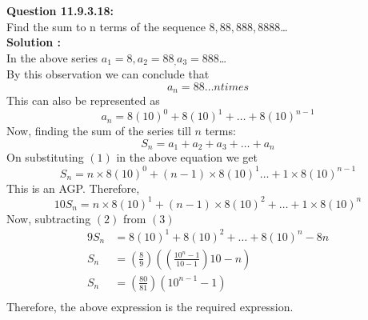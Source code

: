 \documentclass[12pt]{article}
\begin{document}
 \textbf{Question 11.9.3.18:}\\
 Find the sum to n terms of the sequence $8,88,888,8888$\ldots\\
 \textbf{Solution :}\\
 In the above series $a_1=8,a_2=88_,a_3=888$\ldots\\
 By this observation we can conclude that $$a_n=88\ldots n times$$
 This can also be represented as 
 \begin{equation}
 \tag{1}
  a_n=8(10)^0+8(10)^1+\ldots+8(10)^{n-1}
  \end{equation}
  Now, finding the sum of the series till $n$ terms:
 $$S_n=a_1+a_2+a_3+\ldots+a_n$$ 
 On substituting $(1)$ in the above equation we get 
\begin{equation}
\tag{2}
 S_n=n\times 8(10)^0+(n-1)\times 8(10)^1\ldots+1\times 8(10)^{n-1}
 \end{equation} 
 This is an AGP. Therefore,
 \begin{equation}
\tag{3}
 10S_n=n\times 8(10)^1+(n-1)\times 8(10)^2+\ldots+1\times 8(10)^n
 \end{equation}
 Now, subtracting $(2)$ from $(3)$
 \begin{align*}
 9S_n&=8(10)^1+8(10)^2+\ldots+8(10)^n-8n\\[10pt]
 S_n&=\left(\frac{8}{9}\right)\left(\left(\frac{10^n-1}{10-1}\right)10-n\right)\\[10pt]
 S_n&=\left(\frac{80}{81}\right)(10^{n-1}-1)\\
 \end{align*}
 Therefore, the above expression is the required expression.
 
\end{document}

